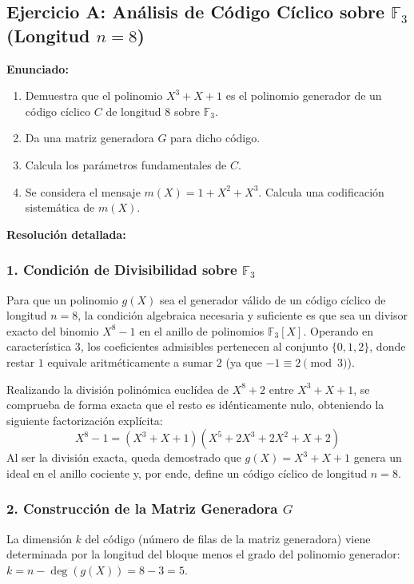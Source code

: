 \documentclass{article}
\begin{document}
\subsection{Ejercicio A: Análisis de Código Cíclico sobre \texorpdfstring{$\mathbb{F}_3$}{F3} (Longitud \texorpdfstring{$n=8$}{n=8})}

\textbf{Enunciado:} 
\begin{enumerate}
    \item Demuestra que el polinomio $X^3 + X + 1$ es el polinomio generador de un código cíclico $C$ de longitud $8$ sobre $\mathbb{F}_3$.
    \item Da una matriz generadora $G$ para dicho código.
    \item Calcula los parámetros fundamentales de $C$.
    \item Se considera el mensaje $m(X) = 1 + X^2 + X^3$. Calcula una codificación sistemática de $m(X)$.
\end{enumerate}

\textbf{Resolución detallada:}

\subsubsection{1. Condición de Divisibilidad sobre \texorpdfstring{$\mathbb{F}_3$}{F3}}
Para que un polinomio $g(X)$ sea el generador válido de un código cíclico de longitud $n=8$, la condición algebraica necesaria y suficiente es que sea un divisor exacto del binomio $X^8 - 1$ en el anillo de polinomios $\mathbb{F}_3[X]$. Operando en característica 3, los coeficientes admisibles pertenecen al conjunto $\{0, 1, 2\}$, donde restar $1$ equivale aritméticamente a sumar $2$ (ya que $-1 \equiv 2 \pmod 3$).

Realizando la división polinómica euclídea de $X^8 + 2$ entre $X^3 + X + 1$, se comprueba de forma exacta que el resto es idénticamente nulo, obteniendo la siguiente factorización explícita:
\[
X^8 - 1 = (X^3 + X + 1)(X^5 + 2X^3 + 2X^2 + X + 2)
\]
Al ser la división exacta, queda demostrado que $g(X) = X^3 + X + 1$ genera un ideal en el anillo cociente y, por ende, define un código cíclico de longitud $n = 8$.

\subsubsection{2. Construcción de la Matriz Generadora \texorpdfstring{$G$}{G}}
La dimensión $k$ del código (número de filas de la matriz generadora) viene determinada por la longitud del bloque menos el grado del polinomio generador: $k = n - \operatorname{deg}(g(X)) = 8 - 3 = 5$. 
\end{document}
